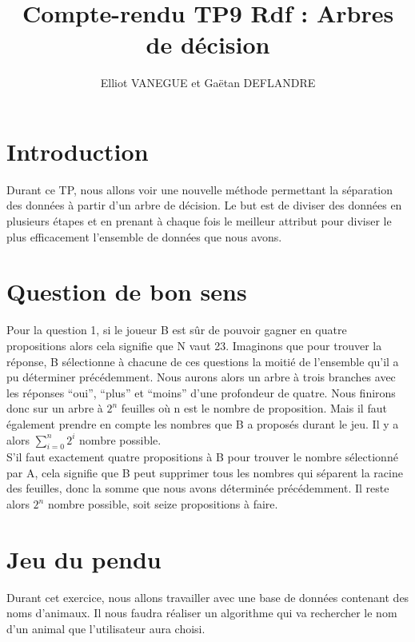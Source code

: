 \documentclass[a4paper,11pt]{article}
\title{Compte-rendu TP9 Rdf : Arbres de décision}
\author{Elliot VANEGUE et Gaëtan DEFLANDRE}
\begin{document}
  
  
  
  \maketitle
  
  \mbox{}
  \newpage
  \clearpage
  
  \section*{Introduction}
   Durant ce TP, nous allons voir une nouvelle méthode permettant la séparation des données à partir
   d'un arbre de décision. Le but est de diviser des données en plusieurs étapes et en prenant à chaque fois
   le meilleur attribut pour diviser le plus efficacement l'ensemble de données que nous avons.

  \section{Question de bon sens}
  Pour la question 1, si le joueur B est sûr de pouvoir gagner en quatre propositions alors cela signifie
  que N vaut 23. Imaginons que pour trouver la réponse, B sélectionne à chacune de ces questions la moitié
  de l'ensemble qu'il a pu déterminer précédemment. Nous aurons alors un arbre à trois branches avec les réponses
  \enquote{oui}, \enquote{plus} et \enquote{moins} d'une profondeur de quatre. Nous finirons donc sur un 
  arbre à $2^n$ feuilles où n est le nombre de proposition. Mais il faut également prendre en compte les nombres que B a proposés
  durant le jeu. Il y a alors $\sum_{i=0}^n 2^i$ nombre possible.\\
  
  S'il faut exactement quatre propositions à B pour trouver le nombre sélectionné par A, cela signifie que B peut 
  supprimer tous les nombres qui séparent la racine des feuilles, donc la somme que nous avons déterminée précédemment.
  Il reste alors $2^n$ nombre possible, soit seize propositions à faire.
  
  \section{Jeu du pendu}
  Durant cet exercice, nous allons travailler avec une base de données contenant des noms d'animaux. Il nous
  faudra réaliser un algorithme qui va rechercher le nom d'un animal que l'utilisateur aura choisi.\\
  
\end{document}
